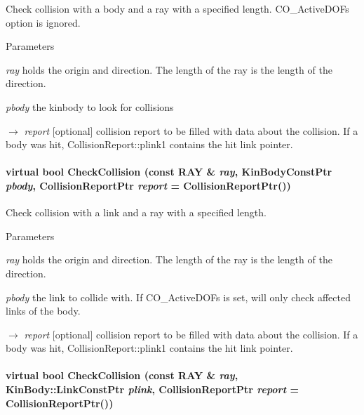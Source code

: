 Check collision with a body and a ray with a specified length. CO\_\-ActiveDOFs option is ignored. 


\begin{DoxyParams}{Parameters}
\item[{\em ray}]holds the origin and direction. The length of the ray is the length of the direction. \item[{\em pbody}]the kinbody to look for collisions \item[\mbox{$\rightarrow$} {\em report}]\mbox{[}optional\mbox{]} collision report to be filled with data about the collision. If a body was hit, CollisionReport::plink1 contains the hit link pointer. \end{DoxyParams}
\hypertarget{classOpenRAVE_1_1CollisionCheckerBase_a91d971fb7be4e4b653fd02ee9bd6528c}{
\paragraph[{CheckCollision}]{\setlength{\rightskip}{0pt plus 5cm}virtual bool CheckCollision (const {\bf RAY} \& {\em ray}, \/  KinBodyConstPtr {\em pbody}, \/  CollisionReportPtr {\em report} = {\ttfamily CollisionReportPtr()})}\hfill}
\label{classOpenRAVE_1_1CollisionCheckerBase_a91d971fb7be4e4b653fd02ee9bd6528c}


Check collision with a link and a ray with a specified length. 


\begin{DoxyParams}{Parameters}
\item[{\em ray}]holds the origin and direction. The length of the ray is the length of the direction. \item[{\em pbody}]the link to collide with. If CO\_\-ActiveDOFs is set, will only check affected links of the body. \item[\mbox{$\rightarrow$} {\em report}]\mbox{[}optional\mbox{]} collision report to be filled with data about the collision. If a body was hit, CollisionReport::plink1 contains the hit link pointer. \end{DoxyParams}
\hypertarget{classOpenRAVE_1_1CollisionCheckerBase_a0031940d50e5853bed26dd8f37eeb9d6}{
\paragraph[{CheckCollision}]{\setlength{\rightskip}{0pt plus 5cm}virtual bool CheckCollision (const {\bf RAY} \& {\em ray}, \/  KinBody::LinkConstPtr {\em plink}, \/  CollisionReportPtr {\em report} = {\ttfamily CollisionReportPtr()})}\hfill}
\label{classOpenRAVE_1_1CollisionCheckerBase_a0031940d50e5853bed26dd8f37eeb9d6}


